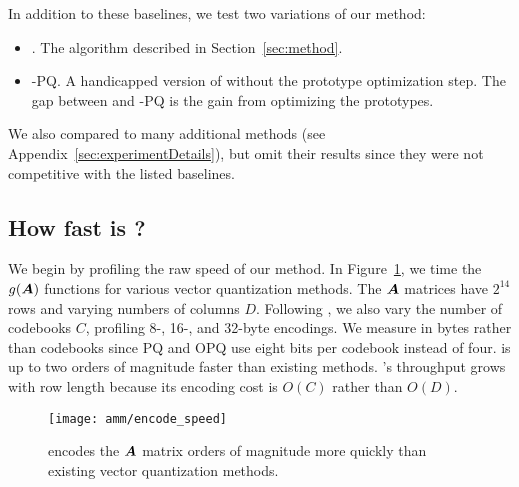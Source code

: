 In addition to these baselines, we test two variations of our method:
\vspace{-2mm}
\begin{itemize}\itemsep0em
    \item \ours. The algorithm described in Section~\ref{sec:method}.
    \item \ours-PQ. A handicapped version of \oursp without the prototype optimization step. The gap between \oursp and \ours-PQ is the gain from optimizing the prototypes.
\end{itemize}
\vspace{-2mm}
We also compared to many additional methods (see Appendix~\ref{sec:experimentDetails}), but omit their results since they were not competitive with the listed baselines.

\subsection{How fast is \ours?}

We begin by profiling the raw speed of our method. In Figure~\ref{fig:encodeSpeed}, we time the $g(\bm{A})$ functions for various vector quantization methods. The $\bm{A}$ matrices have $2^{14}$ rows and varying numbers of columns $D$. Following \cite{bolt}, we also vary the number of codebooks $C$, profiling 8-, 16-, and 32-byte encodings. We measure in bytes rather than codebooks since PQ and OPQ use eight bits per codebook instead of four. \oursp is up to two orders of magnitude faster than existing methods. \ours's throughput grows with row length because its encoding cost is $O(C)$ rather than $O(D)$. %

\begin{figure}[h]
\begin{center}
\texttt{[image: amm/encode\_speed]}
\caption{\oursp encodes the $\bm{A}$ matrix orders of magnitude more quickly than existing vector quantization methods.}
\label{fig:encodeSpeed}
\end{center}
\end{figure}

